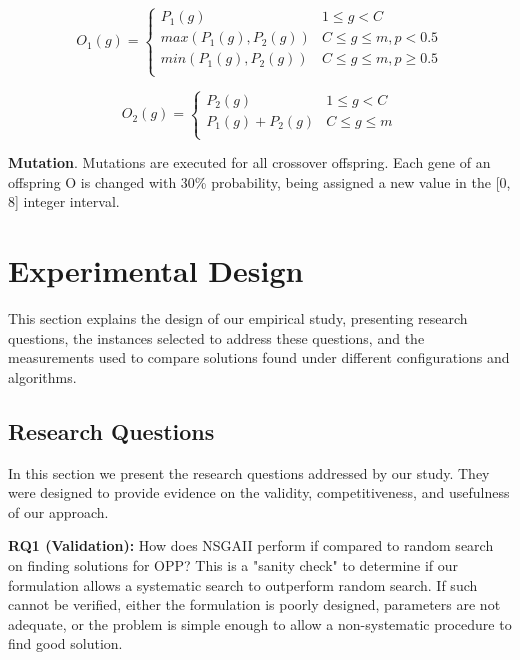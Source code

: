 \documentclass[conference]{IEEEtran}
\begin{document}
\setlength\abovedisplayskip{0pt}
\setlength\belowdisplayshortskip{0pt}
\begin{small}
\begin{equation}
O_{1}(g)=
\left \{
\begin{array}{ll}
P_{1}(g) & 1\leq g < C \\
max(P_{1}(g), P_{2}(g)) & C\leq g\leq m,p < 0.5 \\
min(P_{1}(g), P_{2}(g)) & C\leq g\leq m,p \geq 0.5 \\
\end{array}
\right.
\end{equation}

\setlength\abovedisplayshortskip{0pt}
\setlength\belowdisplayshortskip{0pt}
\small
\begin{equation}
O_{2}(g)=
\left \{
\begin{array}{ll}
P_{2}(g)& 1\leq g < C \\
P_{1}(g)+P_{2}(g) & C\leq g\leq m\\
\end{array}
\right.
\end{equation}
\end{small}

\noindent
\textbf{Mutation}. Mutations are executed for all crossover offspring. Each gene of an offspring O is changed with 30\% probability, being assigned a new value in the [0, 8] integer interval.

\section{Experimental Design}
This section explains the design of our empirical study, presenting research questions, the instances selected to address these questions, and the measurements used to compare solutions found under different configurations and algorithms.
\subsection{Research Questions}

In this section we present the research questions addressed by our study. They were designed to provide evidence on the validity, competitiveness, and usefulness of our approach.

\noindent
\textbf{RQ1 (Validation):} How does NSGAII perform if compared to random search on finding solutions for OPP? This is a "sanity check" to determine if our formulation allows a systematic search to outperform random search. If such cannot be verified, either the formulation is poorly designed, parameters are not adequate, or the problem is simple enough to allow a non-systematic procedure to find good solution.
\end{document}
